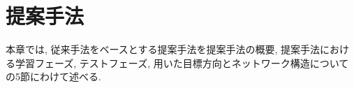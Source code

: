 \chapter{提案手法}
\label{chap:suggest}
%
本章では, 従来手法をベースとする提案手法を提案手法の概要, 提案手法における学習フェーズ, 
テストフェーズ, 用いた目標方向とネットワーク構造についての5節にわけて述べる.
%
%





%
